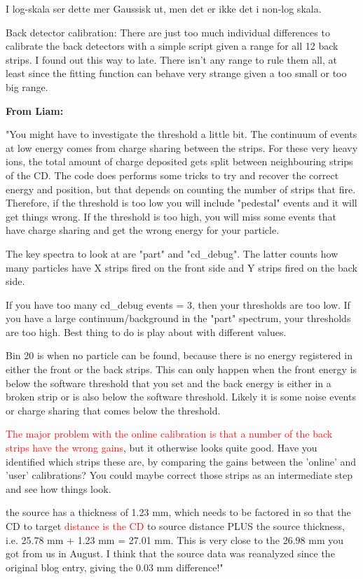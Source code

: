 \documentclass[twoside,english]{uiofysmaster/uiofysmaster}
\begin{document}
I log-skala ser dette mer Gaussisk ut, men det er ikke det i non-log skala. 


Back detector calibration: There are just too much individual differences to calibrate the back detectors with a simple script given a range for all 12 back strips. I found out this way to late. There isn't any range to rule them all, at least since the fitting function can behave very strange given a too small or too big range.



\textbf{From Liam:}

"You might have to investigate the threshold a little bit. The continuum of events at low energy comes from charge sharing between the strips. For these very heavy ions, the total amount of charge deposited gets split between neighbouring strips of the CD. The code does performs some tricks to try and recover the correct energy and position, but that depends on counting the number of strips that fire. Therefore, if the threshold is too low you will include "pedestal" events and it will get things wrong. If the threshold is too high, you will miss some events that have charge sharing and get the wrong energy for your particle. 

The key spectra to look at are "part" and "cd\_debug". The latter counts how many particles have X strips fired on the front side and Y strips fired on the back side.

If you have too many cd\_debug events = 3, then your thresholds are too low. If you have a large continuum/background in the "part" spectrum, your thresholds are too high. Best thing to do is play about with different values.

Bin 20 is when no particle can be found, because there is no energy registered in either the front or the back strips. This can only happen when the front energy is below the software threshold that you set and the back energy is either in a broken strip or is also below the software threshold. Likely it is some noise events or charge sharing that comes below the threshold.

\textcolor{red}{The major problem with the online calibration is that a number of the back strips have the wrong gains}, but it otherwise looks quite good. Have you identified which strips these are, by comparing the gains between the 'online' and 'user' calibrations? You could maybe correct those strips as an intermediate step and see how things look.

the source has a thickness of 1.23 mm, which needs to be factored in so that the CD to target \textcolor{red}{distance is the CD} to source distance PLUS the source thickness, i.e. 25.78 mm + 1.23 mm =  27.01 mm. This is very close to the 26.98 mm you got from us in August. I think that the source data was reanalyzed since the original blog entry, giving the 0.03 mm difference!"
\end{document}
